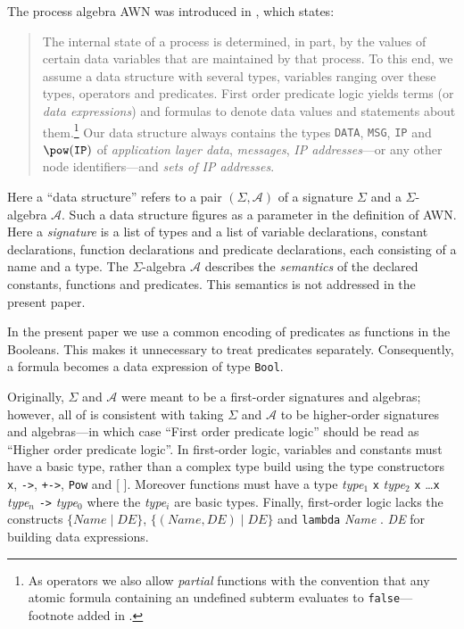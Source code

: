 \documentclass[adraft]{eptcs}
\newcommand{\aac}[1]{{\tt #1}}    %
\newcommand{\A}{{\mathcal{A}}}     %
\begin{document}
The process algebra AWN was introduced in \cite{ESOP12,TR13}, which states:
\begin{quote}
  The internal state of a process is determined, in part, by the values
  of certain data variables that are maintained by that process.  To
  this end, we assume a data structure with several types, variables
  ranging over these types, operators and predicates. First order
  predicate logic yields terms (or \emph{data expressions}) and formulas
  to denote data values and statements about them.\label{pg:undefvalues}\footnote{As
      operators we also allow \emph{partial} functions with the
      convention that any atomic formula containing an undefined subterm
      evaluates to {\tt false}---footnote added in \cite{TR13}.} Our data structure
  always contains the types \aac{DATA}, \aac{MSG}, \aac{IP} and $\pow(\aac{IP})$ of
  \emph{application layer data}, \emph{messages}, \emph{IP addresses}---or any
  other node identifiers---and \emph{sets of IP addresses}.
\end{quote}
Here a ``data structure'' refers to a pair $(\Sigma,\A)$ of a signature $\Sigma$ and 
a $\Sigma$-algebra $\A$. Such a data structure figures as a parameter in the definition of AWN\@.
Here a \emph{signature} is a list of types and a list of variable declarations, constant
declarations, function declarations and predicate declarations, each consisting of a name and a type.
The  $\Sigma$-algebra $\A$ describes the \emph{semantics} of the declared constants, functions and
predicates. This semantics is not addressed in the present paper.

In the present paper we use a common encoding of predicates as functions in the Booleans.
This makes it unnecessary to treat predicates separately. Consequently, a formula becomes a data
expression of type {\tt Bool}.

Originally, $\Sigma$ and $\A$ were meant to be a first-order signatures and algebras;
however, all of \cite{ESOP12,TR13} is consistent with taking $\Sigma$ and
$\A$ to be higher-order signatures and algebras---in which
case ``First order predicate logic'' should be read as ``Higher order predicate logic''.
In first-order logic, variables and constants
must have a basic type, rather than a complex type build using the type constructors {\tt x},
{\tt ->}, {\tt +->}, \aac{Pow} and [  ]. Moreover functions must have a type
\textit{type}$_1$ {\tt x} \textit{type}$_2$ {\tt x} \dots {\tt x} \textit{type}$_n$ {\tt ->} \textit{type}$_0$
where the \textit{type}$_i$ are basic types. Finally, first-order logic lacks the constructs  $\{\textit{Name}\mid \textit{DE}\}$,
$\{(\textit{Name},\textit{DE})\mid \textit{DE}\}$ and  \aac{lambda} \textit{Name} . \textit{DE} for
building data expressions.
\end{document}
